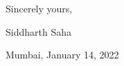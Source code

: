 \documentclass[12pt]{article}
\begin{document}
\setlength{\parskip}{0pt plus1pt}


\vspace{15pt}
\noindent Sincerely yours,\par
\noindent Siddharth Saha \par
\noindent Mumbai, January 14, 2022
\end{document}
